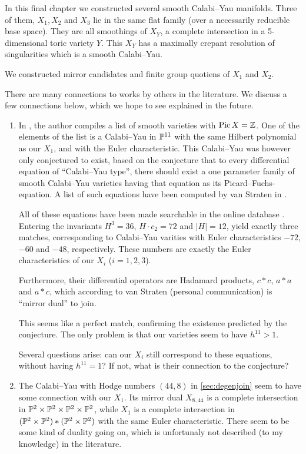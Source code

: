 In this final chapter we constructed several smooth Calabi--Yau manifolds. Three of them, $X_1,X_2$ and $X_3$ lie in the same flat family (over a necessarily reducible base space). They are all smoothings of $X_Y$, a complete intersection in a 5-dimensional toric variety $Y$. This $X_Y$ has a maximally crepant resolution of singularities which is a smooth Calabi--Yau.

We constructed mirror candidates and finite group quotiens of $X_1$ and $X_2$.

There are many connections to works by others in the literature. We discuss a few connections below, which we hope to see explained in the future.

\begin{enumerate}
	\item In \cite{kapustka_delpezzo}, the author compiles a list of smooth \CY varieties with $\Pic X = \Z$. One of the elements of the list is a Calabi--Yau in $\P^{11}$ with the same Hilbert polynomial as our $X_1$, and with the Euler characteristic. This Calabi--Yau was however only conjectured to exist, based on the conjecture that to every differential equation of ``Calabi--Yau type'', there should exist a one parameter family of smooth Calabi--Yau varieties having that equation as its Picard--Fuchs-equation. A list of such equations have been computed by van Straten in \cite{monodromy_straten}.

	All of these equations have been made searchable in the online database \cite{cy_database}. Entering the invariants $H^3=36$, $H \cdot c_2 = 72$ and $|H|=12$, yield exactly three matches, corresponding to Calabi--Yau varities with Euler characteristics $-72$, $-60$ and $-48$, respectively. These numbers are exactly the Euler characteristics of our $X_i$ ($i=1,2,3$).

	Furthermore, their differential operators are Hadamard products, $c \ast c$, $a \ast a$ and $a \ast c$, which according to van Straten (personal communication) is ``mirror dual'' to join.

	This seems like a perfect match, confirming the existence predicted by the conjecture. The only problem is that our varieties seem to have $h^{11} > 1$.

	Several questions arise: can our $X_i$ still correspond to these equations, without having $h^{11}=1$? If not, what is their connection to the conjecture?

	\item The Calabi--Yau with Hodge numbers $(44,8)$ in \cref{sec:degenjoin} seem to have some connection with our $X_1$. Its mirror dual $X_{8,44}$ is a complete intersection in $\P^2 \times \P^2 \times \P^2 \times \P^2$, while $X_1$ is a complete intersection in $(\P^2 \times \P^2) \ast (\P^2 \times \P^2)$ with the same Euler characteristic. There seem to be some kind of duality going on, which is unfortunaly not described (to my knowledge) in the literature.


\end{enumerate}
